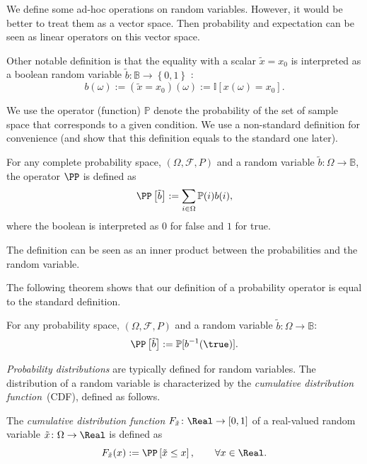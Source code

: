 

\begin{remark}
We define some ad-hoc operations on random variables. However, it would be better to treat them as a vector space. Then probability and expectation can be seen as linear operators on this vector space. 

Other notable definition is that the equality with a scalar $\tilde{x} = x_0$ is interpreted as a boolean random variable $\tilde{b}: \mathbb{B} \to \left\{ 0,1 \right\}$ :
\[
  b(\omega) := (\tilde{x} = x_0)(\omega) := \mathbb{I}[ x(\omega) = x_0].
\]

\end{remark}

We use the operator (function) $\mathbb{P}$ denote the probability of the set of sample space that corresponds to a given condition. We use a non-standard definition for convenience (and show that this definition equals to the standard one later).
\begin{definition}
For any complete probability space, $(\Omega, \mathcal{F}, P)$ and a random variable $\tilde{b}\colon \Omega \to \mathbb{B}$, the operator $\PP$ is defined as
\[
\PP\left[ \tilde{b} \right] := \sum_{i\in \Omega} \mathbb{P}(i) b(i),
\]
where the boolean is interpreted as $0$ for false and $1$ for true. 
\end{definition}
The definition can be seen as an inner product between the probabilities and the random variable. 

The following theorem shows that our definition of a probability operator is equal to the standard definition.
\begin{theorem}
  For any probability space, $(\Omega, \mathcal{F}, P)$ and a random variable $\tilde{b}\colon \Omega \to \mathbb{B}$: 
  \[
   \PP\left[\tilde{b} \right] := \mathbb{P}[b^{-1}(\true)]. 
 \]
\end{theorem}

\emph{Probability distributions} are typically defined for random variables. The distribution of a random variable is characterized by the \emph{cumulative distribution function}~(CDF), defined as follows.
\begin{definition}[CDF]
  The \emph{cumulative distribution function} $F_{\tilde{x}}\colon \Real \to [0,1]$ of a real-valued random variable $\tilde{x}\colon \Omega \to \Real$ is defined as
  \[
   F_{\tilde{x}}(x) := \PP\left[\tilde{x} \le x\right], \qquad \forall x\in \Real. 
  \]
\end{definition}


